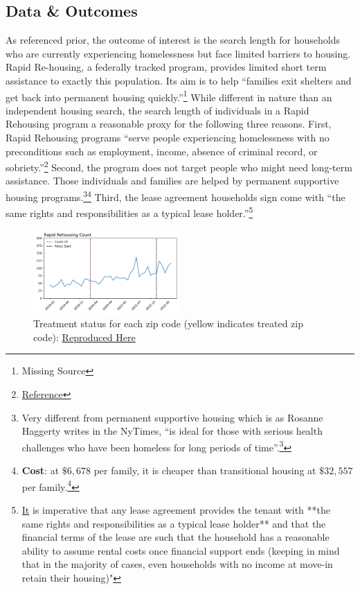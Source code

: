 \documentclass[a4paper,12pt]{article}
\begin{document}
\subsection{Data \& Outcomes}
As referenced prior, the outcome of interest is the search length for households who are currently experiencing homelessness but face limited barriers to housing. Rapid Re-housing, a federally tracked program, provides limited short term assistance to exactly this population. Its aim is to help ``families exit shelters and get back into permanent housing quickly.''\footnote{\textrm{Missing Source}} While different in nature than an independent housing search, the search length of individuals in a Rapid Rehousing program a reasonable proxy for the following three reasons. First, Rapid Rehousing programs ``serve people experiencing homelessness with no preconditions such as employment, income, absence of criminal record, or sobriety.''\footnote{\href{https://www.urban.org/sites/default/files/publication/99153/rapid_re-housings_role_in_responding_to_homelessness_3.pdf}{Reference}} Second, the program does not target people who might need long-term assistance. Those individuals and families are helped by permanent supportive housing programs.\footnote{Very different from permanent supportive housing which is as Rosanne Haggerty writes in the NyTimes, ``is ideal for those with serious health challenges who have been homeless for long periods of time''.\footnote{\href{https://www.nytimes.com/roomfordebate/2015/02/19/homes-for-the-homeless/for-even-the-neediest-housing-is-the-solution-to-homelessness}{NyTimes}}}\footnote{ \textbf{Cost}: at $\$6,678$ per family, it is cheaper than transitional housing at $\$32,557$ per family.\footnote{\href{https://cceh.org/provider-resources/rapid-rehousing/}{CCEH Video}}} Third, the lease agreement households sign come with ``the same rights and responsibilities as a typical lease holder.''\footnote{\href{thttps://endhomelessness.org/resource/rapid-re-housing-a-history-and-core-components/}{It} is imperative that any lease agreement provides the tenant with **the same rights and responsibilities as a typical lease holder** and that the financial terms of the lease are such that the household has a reasonable ability to assume rental costs once financial support ends (keeping in mind that in the majority of cases, even households with no income at move-in retain their housing)"}
\begin{figure}[htbp]
\centering
\includegraphics[width=0.5\textwidth]{figures/rtc/context/rrh_counts.pdf}
        \caption{Treatment status for each zip code (yellow indicates treated zip code): \href{https://github.com/pharringtonp19/evictions/blob/main/scripts/cceh/plot/summary_rrh.py}{Reproduced Here}}
\end{figure}
\end{document}

